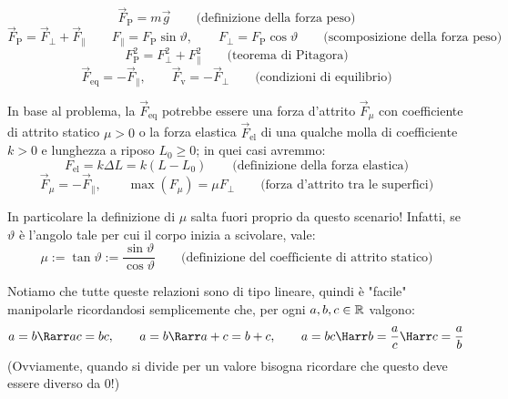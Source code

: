 \documentclass{article}
\begin{document}
\[ \vec{F}_{\text{P}} = m \vec{g} \qquad \text{(definizione della forza peso)} \]
\[ \vec{F}_{\text{P}} = \vec{F}_{\perp} + \vec{F}_{\parallel} \qquad F_{\parallel} =  F_{\text{P}} \sin\vartheta, \qquad F_{\perp} =  F_{\text{P}} \cos\vartheta \qquad \text{(scomposizione della forza peso)} \]
\[ F_{\text{P}}^2 = F_{\perp}^2 + F_{\parallel}^2 \qquad \text{(teorema di Pitagora)} \]
\[ \vec{F}_{\text{eq}} = -\vec{F}_{\parallel}, \qquad \vec{F}_{\text{v}} = -\vec{F}_{\perp} \qquad \text{(condizioni di equilibrio)} \]

In base al problema, la $\vec{F}_{\text{eq}}$ potrebbe essere una forza d'attrito $\vec{F}_\mu$ con coefficiente di attrito statico $\mu>0$ o la forza elastica $\vec{F}_{\text{el}}$ di una qualche molla di coefficiente $k>0$ e lunghezza a riposo $L_0\ge 0$; in quei casi avremmo:
\[ F_{\text{el}} = k \Delta L = k(L-L_0) \qquad \text{(definizione della forza elastica)} \]
\[ \vec{F}_\mu = -\vec{F}_{\parallel}, \qquad \max(F_{\mu}) = \mu F_{\perp} \qquad \text{(forza d'attrito tra le superfici)} \]

In particolare la definizione di $\mu$ salta fuori proprio da questo scenario! Infatti, se $\vartheta$ è l'angolo tale per cui il corpo inizia a scivolare, vale:
\[ \mu := \tan\vartheta := \frac{\sin\vartheta}{\cos\vartheta} \qquad \text{(definizione del coefficiente di attrito statico)} \]

Notiamo che tutte queste relazioni sono di tipo lineare, quindi è "facile" manipolarle ricordandosi semplicemente che, per ogni $a,b,c \in \mathbb{R}$ valgono:
\[a = b \Rarr ac = bc, \qquad a = b \Rarr a+c = b+c, \qquad a = bc \Harr b = \frac{a}{c} \Harr c = \frac{a}{b} \]
(Ovviamente, quando si divide per un valore bisogna ricordare che questo deve essere diverso da $0$!)
\end{document}
